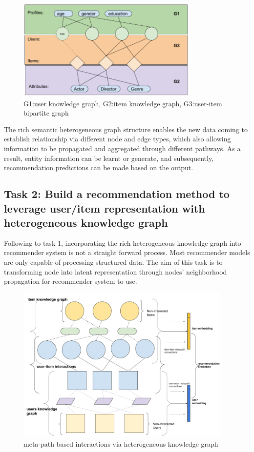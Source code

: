 \begin{figure}[!h]
    \centering
    \includegraphics[width=0.8\textwidth]{figs/ikdiagram.png}
    \caption{G1:user knowledge graph, G2:item knowledge graph, G3:user-item bipartite graph}\label{fig:ikgraph}
\end{figure}

The rich semantic heterogeneous graph structure enables the new data coming to establish relationship via different node and edge types, which also allowing information to be propagated and aggregated through different pathways. As a result, entity information can be learnt or generate, and subsequently, recommendation predictions can be made based on the output. 


\subsection*{Task 2: Build a recommendation method to leverage user/item representation with heterogeneous knowledge graph}

Following to task 1, incorporating the rich heterogeneous knowledge graph into recommender system is not a straight forward process. Most recommender models are only capable of processing structured data. The aim of this task is to transforming node into latent representation through nodes' neighborhood propagation for recommender system to use.

\begin{figure}[!t]
    \centering
    \includegraphics[width=0.95\textwidth]{figs/meta-embedding.png}
    \caption{meta-path based interactions via heterogeneous knowledge graph}\label{fig:meta_task2}
\end{figure}

